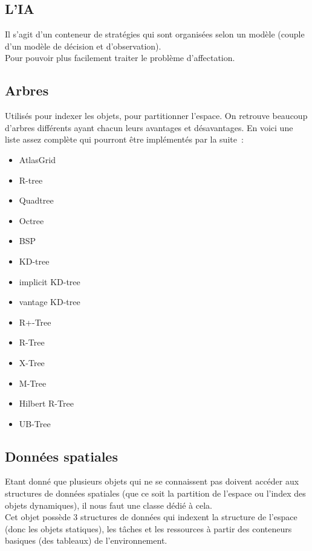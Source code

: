 \subsection{L'IA}

Il s'agit d'un conteneur de stratégies qui sont organisées selon un modèle (couple d'un modèle de décision et d'observation).\\
Pour pouvoir plus facilement traiter le problème d'affectation.

\subsection{Arbres}

Utilisés pour indexer les objets, pour partitionner l'espace. On retrouve beaucoup d'arbres différents ayant chacun leurs avantages et désavantages. En voici une liste assez complète qui pourront être implémentés par la suite~:
\begin{itemize}
\item AtlasGrid
\item R-tree
\item Quadtree
\item Octree
\item BSP
\item KD-tree
\item implicit KD-tree
\item vantage KD-tree
\item R+-Tree
\item R-Tree
\item X-Tree
\item M-Tree
\item Hilbert R-Tree
\item UB-Tree
\end{itemize}

\subsection{Données spatiales}

Etant donné que plusieurs objets qui ne se connaissent pas doivent accéder aux structures de données spatiales (que ce soit la partition de l'espace ou l'index des objets dynamiques), il nous faut une classe dédié à cela.\\
Cet objet possède 3 structures de données qui indexent la structure de l'espace (donc les objets statiques), les tâches et les ressources à partir des conteneurs basiques (des tableaux) de l'environnement.\\\\

